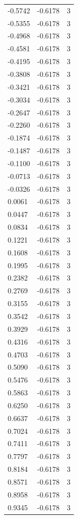 \begin{longtable}{lrr}
  -0.5742 & -0.6178 & 3 \\
  -0.5355 & -0.6178 & 3 \\
  -0.4968 & -0.6178 & 3 \\
  -0.4581 & -0.6178 & 3 \\
  -0.4195 & -0.6178 & 3 \\
  -0.3808 & -0.6178 & 3 \\
  -0.3421 & -0.6178 & 3 \\
  -0.3034 & -0.6178 & 3 \\
  -0.2647 & -0.6178 & 3 \\
  -0.2260 & -0.6178 & 3 \\
  -0.1874 & -0.6178 & 3 \\
  -0.1487 & -0.6178 & 3 \\
  -0.1100 & -0.6178 & 3 \\
  -0.0713 & -0.6178 & 3 \\
  -0.0326 & -0.6178 & 3 \\
  0.0061 & -0.6178 & 3 \\
  0.0447 & -0.6178 & 3 \\
  0.0834 & -0.6178 & 3 \\
  0.1221 & -0.6178 & 3 \\
  0.1608 & -0.6178 & 3 \\
  0.1995 & -0.6178 & 3 \\
  0.2382 & -0.6178 & 3 \\
  0.2769 & -0.6178 & 3 \\
  0.3155 & -0.6178 & 3 \\
  0.3542 & -0.6178 & 3 \\
  0.3929 & -0.6178 & 3 \\
  0.4316 & -0.6178 & 3 \\
  0.4703 & -0.6178 & 3 \\
  0.5090 & -0.6178 & 3 \\
  0.5476 & -0.6178 & 3 \\
  0.5863 & -0.6178 & 3 \\
  0.6250 & -0.6178 & 3 \\
  0.6637 & -0.6178 & 3 \\
  0.7024 & -0.6178 & 3 \\
  0.7411 & -0.6178 & 3 \\
  0.7797 & -0.6178 & 3 \\
  0.8184 & -0.6178 & 3 \\
  0.8571 & -0.6178 & 3 \\
  0.8958 & -0.6178 & 3 \\
  0.9345 & -0.6178 & 3 \\

\end{longtable}
